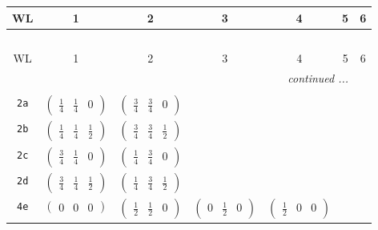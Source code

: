 \documentclass[fleqn,9pt,landscape]{jsarticle}
\begin{document}
\begin{center}
\renewcommand{\arraystretch}{1.2}
\begin{longtable}{ccccccc}
 \hline \hline
WL & 1 & 2 & 3 & 4 & 5 & 6 \\ \hline \endfirsthead

\multicolumn{6}{l}{\tablename\ \thetable{}} \\
 \hline \hline
WL & 1 & 2 & 3 & 4 & 5 & 6 \\ \hline \endhead

 \hline \hline
\multicolumn{6}{r}{\footnotesize\it continued ...} \\ \endfoot

 \hline \hline
\multicolumn{6}{r}{} \\ \endlastfoot

{\tt 2a} & $ \begin{pmatrix} \frac{1}{4} & \frac{1}{4} & 0 \end{pmatrix} $ & $ \begin{pmatrix} \frac{3}{4} & \frac{3}{4} & 0 \end{pmatrix} $ & $  $ & $  $ & $  $ & $  $ \\ \hline
{\tt 2b} & $ \begin{pmatrix} \frac{1}{4} & \frac{1}{4} & \frac{1}{2} \end{pmatrix} $ & $ \begin{pmatrix} \frac{3}{4} & \frac{3}{4} & \frac{1}{2} \end{pmatrix} $ & $  $ & $  $ & $  $ & $  $ \\ \hline
{\tt 2c} & $ \begin{pmatrix} \frac{3}{4} & \frac{1}{4} & 0 \end{pmatrix} $ & $ \begin{pmatrix} \frac{1}{4} & \frac{3}{4} & 0 \end{pmatrix} $ & $  $ & $  $ & $  $ & $  $ \\ \hline
{\tt 2d} & $ \begin{pmatrix} \frac{3}{4} & \frac{1}{4} & \frac{1}{2} \end{pmatrix} $ & $ \begin{pmatrix} \frac{1}{4} & \frac{3}{4} & \frac{1}{2} \end{pmatrix} $ & $  $ & $  $ & $  $ & $  $ \\ \hline
{\tt 4e} & $ \begin{pmatrix} 0 & 0 & 0 \end{pmatrix} $ & $ \begin{pmatrix} \frac{1}{2} & \frac{1}{2} & 0 \end{pmatrix} $ & $ \begin{pmatrix} 0 & \frac{1}{2} & 0 \end{pmatrix} $ & $ \begin{pmatrix} \frac{1}{2} & 0 & 0 \end{pmatrix} $ & $  $ & $  $ \\ \hline

\end{longtable}
\end{center}
\end{document}
